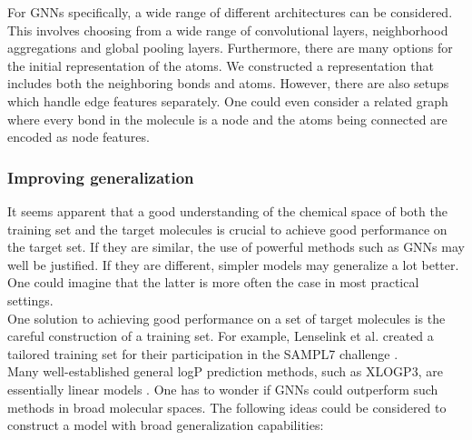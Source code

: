 \documentclass{article}
\begin{document}
For GNNs specifically, a wide range of different architectures can be considered. This involves choosing from a wide range of convolutional layers, neighborhood aggregations and global pooling layers. Furthermore, there are many options for the initial representation of the atoms. We constructed a representation that includes both the neighboring bonds and atoms. However, there are also setups which handle edge features separately. One could even consider a related graph where every bond in the molecule is a node and the atoms being connected are encoded as node features. \\

\subsubsection{Improving generalization}

It seems apparent that a good understanding of the chemical space of both the training set and the target molecules is crucial to achieve good performance on the target set. If they are similar, the use of powerful methods such as GNNs may well be justified. If they are different, simpler models may generalize a lot better. One could imagine that the latter is more often the case in most practical settings. \\

One solution to achieving good performance on a set of target molecules is the careful construction of a training set. For example, Lenselink et al. created a tailored training set for their participation in the SAMPL7 challenge \cite{lenselink2021multitask}. \\

Many well-established general logP prediction methods, such as XLOGP3, are essentially linear models \cite{cheng2007computation}. One has to wonder if GNNs could outperform such methods in broad molecular spaces. The following ideas could be considered to construct a model with broad generalization capabilities:
\end{document}

